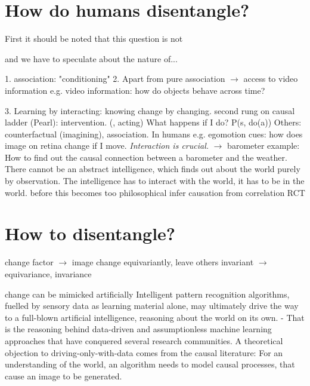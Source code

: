 	\section{How do humans disentangle?}
	First it should be noted that this question is not

	and we have to speculate about the nature of...

	1. association: "conditioning"
	2. Apart from pure association $\rightarrow$  access to video information
	e.g. video information: how do objects behave across time?

	3. Learning by interacting: knowing change by changing.
	second rung on causal ladder (Pearl): intervention. (, acting) What happens if I do?
	P(s, do(a))
	Others: counterfactual (imagining), association.
	In humans e.g. egomotion cues: how does image on retina change if I move.
	\textit{Interaction is crucial.} $\rightarrow$ barometer example: How to find out the causal connection between a barometer and the weather.
	There cannot be an abstract intelligence, which finds out about the world purely by observation. The intelligence has to interact with the world, it has to be in the world.
	before this becomes too philosophical
	infer causation from correlation
	RCT


	\section{How to disentangle?}
	change factor $\rightarrow$  image change equivariantly, leave others invariant
	$\rightarrow$  equivariance, invariance

	change can be mimicked artificially
	Intelligent pattern recognition algorithms, fuelled by sensory data as learning material alone, may ultimately drive the way to a full-blown artificial intelligence, reasoning about the world on its own. - That is the reasoning behind data-driven and assumptionless machine learning approaches that have conquered several research communities.
	A theoretical objection to driving-only-with-data comes from the causal literature: For an understanding of the world, an algorithm needs to model causal processes, that cause an image to be generated.

